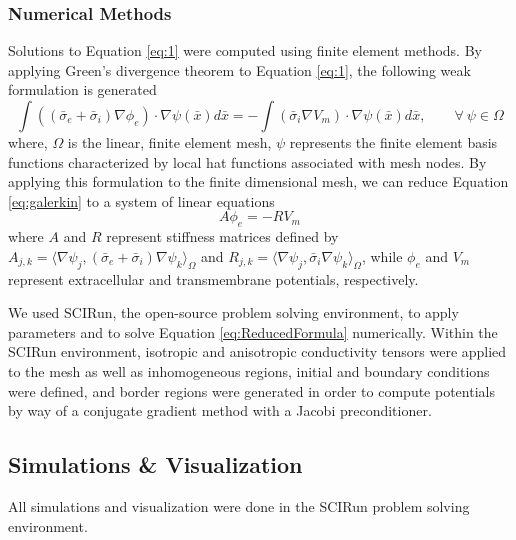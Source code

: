 \subsubsection{Numerical Methods}
\label{sec:numerical}


Solutions to Equation \ref{eq:1} were computed using finite element methods.  By applying 
Green's divergence theorem to Equation \ref{eq:1}, the following weak formulation is generated 
\begin{equation}
\int ((\bar{\sigma}_e + \bar{\sigma}_i)\nabla \phi_e) \cdot \nabla \psi(\bar{x})d\bar{x} = - \int (\bar{\sigma}
_i \nabla V_m)\cdot \nabla \psi(\bar{x})d\bar{x}, \quad \quad \forall \ \psi \in \Omega
\label{eq:galerkin}
\end{equation}
where, $\Omega$ is the linear, finite element mesh, $\psi$ represents the finite element basis functions characterized by local hat functions associated with mesh nodes. By applying this formulation to the finite dimensional mesh, we can reduce Equation \ref{eq:galerkin} to a system of linear equations 
\begin{equation}
A \phi_e = -RV_m
\label{eq:ReducedFormula}
\end{equation}
where $A$ and $R$ represent stiffness matrices defined by $A_{j,k} = \langle \nabla \psi_j,(\bar{\sigma}
_e + \bar{\sigma}_i)\nabla \psi_k \rangle_\Omega$ and $R_{j,k} = \langle \nabla \psi_j,\bar{\sigma}_i
\nabla \psi_k \rangle_\Omega$,
while $\phi_e$ and $V_m$ represent extracellular and transmembrane potentials, respectively.\cite{ref:fem}

We used SCIRun, the open-source problem solving environment, to apply parameters and to solve Equation  \ref{eq:ReducedFormula} numerically.  Within the SCIRun environment, isotropic and anisotropic conductivity tensors were applied to the mesh as well as inhomogeneous regions, initial and boundary conditions were defined, and border regions were generated in order to compute potentials by way of a conjugate gradient method with a Jacobi preconditioner.

\subsection{Simulations \& Visualization}
\label{sec:sim}

All simulations and visualization were done in the SCIRun problem solving environment.

